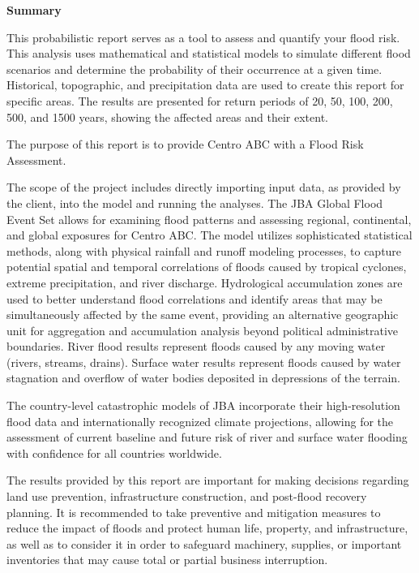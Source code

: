 \documentclass[
]{article}
\begin{document}
\newpage

\noindent \textbf{\textcolor{azuloscuro}{\fontsize{28}{32}\selectfont Summary}}
\label{sec:summary} \vspace{0.5cm}

\fontsize{11}{13}\selectfont This probabilistic report serves as a tool
to assess and quantify your flood risk. This analysis uses mathematical
and statistical models to simulate different flood scenarios and
determine the probability of their occurrence at a given time.
Historical, topographic, and precipitation data are used to create this
report for specific areas. The results are presented for return periods
of 20, 50, 100, 200, 500, and 1500 years, showing the affected areas and
their extent.

\fontsize{11}{13}\selectfont The purpose of this report is to provide
Centro ABC with a Flood Risk Assessment.

\fontsize{11}{13}\selectfont The scope of the project includes directly
importing input data, as provided by the client, into the model and
running the analyses. The JBA Global Flood Event Set allows for
examining flood patterns and assessing regional, continental, and global
exposures for Centro ABC. The model utilizes sophisticated statistical
methods, along with physical rainfall and runoff modeling processes, to
capture potential spatial and temporal correlations of floods caused by
tropical cyclones, extreme precipitation, and river discharge.
Hydrological accumulation zones are used to better understand flood
correlations and identify areas that may be simultaneously affected by
the same event, providing an alternative geographic unit for aggregation
and accumulation analysis beyond political administrative boundaries.
River flood results represent floods caused by any moving water (rivers,
streams, drains). Surface water results represent floods caused by water
stagnation and overflow of water bodies deposited in depressions of the
terrain.

\fontsize{11}{13}\selectfont The country-level catastrophic models of
JBA incorporate their high-resolution flood data and internationally
recognized climate projections, allowing for the assessment of current
baseline and future risk of river and surface water flooding with
confidence for all countries worldwide.

\fontsize{11}{13}\selectfont The results provided by this report are
important for making decisions regarding land use prevention,
infrastructure construction, and post-flood recovery planning. It is
recommended to take preventive and mitigation measures to reduce the
impact of floods and protect human life, property, and infrastructure,
as well as to consider it in order to safeguard machinery, supplies, or
important inventories that may cause total or partial business
interruption.
\end{document}
